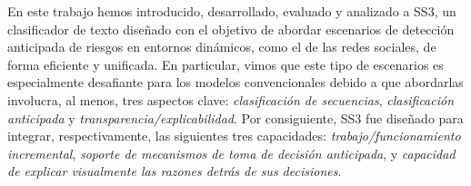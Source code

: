 
En este trabajo hemos introducido, desarrollado, evaluado y analizado a SS3, un clasificador de texto diseñado con el objetivo de abordar escenarios de detección anticipada de riesgos en entornos dinámicos, como el de las redes sociales, de forma eficiente y unificada.
En particular, vimos que este tipo de escenarios es especialmente desafiante para los modelos convencionales debido a que abordarlas involucra, al menos, tres aspectos clave: \emph{clasificación de secuencias}, \emph{clasificación anticipada} y \emph{transparencia/explicabilidad}.
Por consiguiente, SS3 fue diseñado para integrar, respectivamente, las siguientes tres capacidades: \emph{trabajo/funcionamiento incremental}, \emph{soporte de mecanismos de toma de decisión anticipada}, y \emph{capacidad de explicar visualmente las razones detrás de sus decisiones}.

